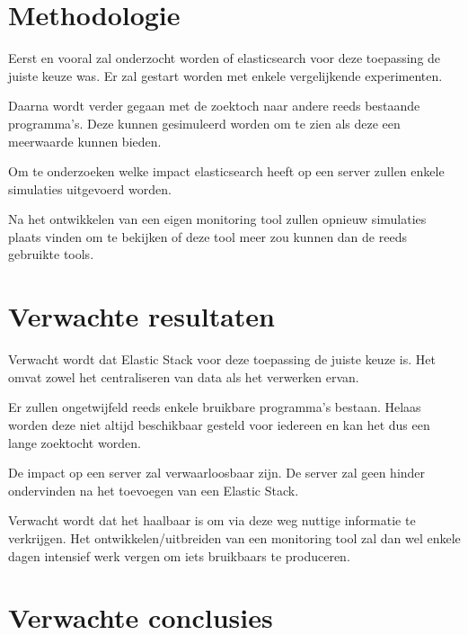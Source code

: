 \documentclass[fleqn,10pt]{voorstel}
\begin{document}
\section{Methodologie}
\label{sec:methodologie}

Eerst en vooral zal onderzocht worden of elasticsearch voor deze toepassing de juiste keuze was. Er zal gestart worden met enkele vergelijkende experimenten. 

Daarna wordt verder gegaan met de zoektoch naar andere reeds bestaande programma's. Deze kunnen gesimuleerd worden om te zien als deze een meerwaarde kunnen bieden. 

Om te onderzoeken welke impact elasticsearch heeft op een server zullen enkele simulaties uitgevoerd worden.

Na het ontwikkelen van een eigen monitoring tool zullen opnieuw simulaties plaats vinden om te bekijken of deze tool meer zou kunnen dan de reeds gebruikte tools. 

\section{Verwachte resultaten}
\label{sec:verwachte_resultaten}

Verwacht wordt dat Elastic Stack voor deze toepassing de juiste keuze is. Het omvat zowel het centraliseren van data als het verwerken ervan.

Er zullen ongetwijfeld reeds enkele bruikbare programma's bestaan. Helaas worden deze niet altijd beschikbaar gesteld voor iedereen en kan het dus een lange zoektocht worden.

De impact op een server zal verwaarloosbaar zijn. De server zal geen hinder ondervinden na het toevoegen van een Elastic Stack.

Verwacht wordt dat het haalbaar is om via deze weg nuttige informatie te verkrijgen. Het ontwikkelen/uitbreiden van een monitoring tool zal dan wel enkele dagen intensief werk vergen om iets bruikbaars te produceren.

\section{Verwachte conclusies}
\label{sec:verwachte_conclusies}
\end{document}
